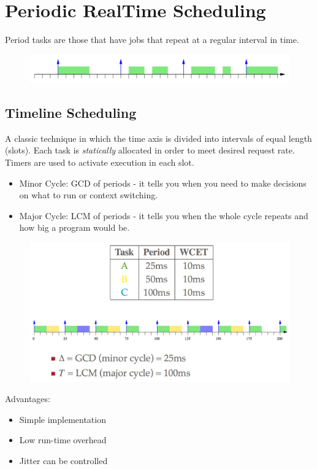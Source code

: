 \documentclass{hw}
\begin{document}
\section{Periodic Real\-Time Scheduling}
Period tasks are those that have jobs that repeat at a regular interval in time.
\begin{figure}[H]
  \centering
  \includegraphics[scale=.6]{period}
\end{figure}

\subsection{Timeline Scheduling}
A classic technique in which the time axis is divided into intervals of equal 
length (slots). Each task is \emph{statically} allocated in order to meet
desired request rate. Timers are used to activate execution in each slot.
\begin{itemize}
  \item Minor Cycle: GCD of periods - it tells you when you need to make 
    decisions on what to run or context switching.
  \item Major Cycle: LCM of periods - it tells you when the whole cycle repeats
    and how big a program would be.
\end{itemize}
\begin{figure}[H]
  \centering
  \includegraphics[scale=.6]{timeline}
\end{figure}
Advantages:
\begin{itemize}
  \item Simple implementation
  \item Low run-time overhead
  \item Jitter can be controlled
\end{itemize}
\end{document}
